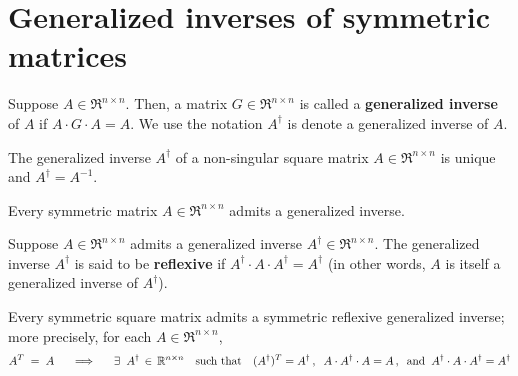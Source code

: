

\section{Generalized inverses of symmetric matrices}
\setcounter{theorem}{0}
\setcounter{equation}{0}

\renewcommand{\theenumi}{\roman{enumi}}
\renewcommand{\labelenumi}{\textnormal{(\theenumi)}$\;\;$}


\begin{definition}
\mbox{}\vskip 0.1cm\noindent
Suppose $A \in \Re^{n \times n}$.
Then, a matrix $G \in \Re^{n \times n}$ is called a
\textbf{generalized inverse} of $A$ if
$A\cdot G\cdot A = A$.
We use the notation $A^{\dagger}$ is denote
a generalized inverse of $A$.
\end{definition}

\begin{proposition}
\mbox{}\vskip 0.1cm\noindent
The generalized inverse $A^{\dagger}$ of a non-singular square matrix $A \in \Re^{n \times n}$
is unique and $A^{\dagger} = A^{-1}$. 
\end{proposition}

\begin{proposition}
\mbox{}\vskip 0.1cm\noindent
Every symmetric matrix $A \in \Re^{n \times n}$ admits a generalized inverse.
\end{proposition}

\begin{definition}
\mbox{}\vskip 0.1cm\noindent
Suppose $A \in \Re^{n \times n}$ admits a generalized inverse $A^{\dagger} \in \Re^{n \times n}$.
The generalized inverse $A^{\dagger}$ is said to be \textbf{reflexive} if
$A^{\dagger} \cdot A \cdot A^{\dagger} = A^{\dagger}$ (in other words,
$A$ is itself a generalized inverse of $A^{\dagger}$).
\end{definition}

\begin{theorem}
\mbox{}\vskip 0.1cm\noindent
Every symmetric square matrix admits a symmetric reflexive
generalized inverse; more precisely, for each $A \in \Re^{n \times n}$,
\begin{equation*}
A^{T} \;=\; A
\quad\;\;\Longrightarrow\quad\;\;
\exists\;\;A^{\dagger} \,\in\, \Re^{n \times n}
\quad\textnormal{such that}\quad
(A^{\dagger})^{T} = A^{\dagger}\,,\;\;
A \cdot A^{\dagger} \cdot A = A\,,\;\;
\textnormal{and}\;\;
A^{\dagger} \cdot A \cdot A^{\dagger} = A^{\dagger}
\end{equation*}
\end{theorem}

